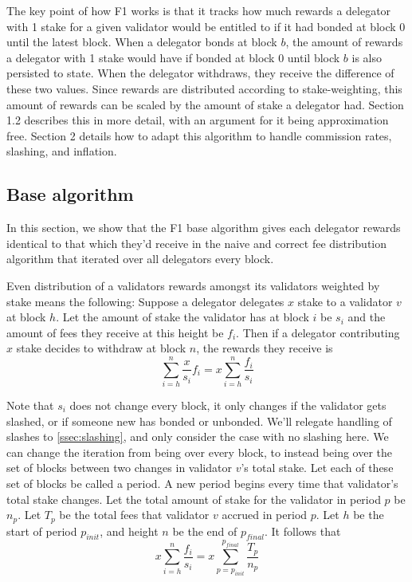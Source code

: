 \documentclass[]{article}
\begin{document}
The key point of how F1 works is that it tracks how much rewards a delegator with 1 stake for a given validator would be entitled to if it had bonded at block 0 until the latest block.
When a delegator bonds at block $b$, the amount of rewards a delegator with 1 stake would have if bonded at block 0 until block $b$ is also persisted to state.
When the delegator withdraws, they receive the difference of these two values.
Since rewards are distributed according to stake-weighting, this amount of rewards can be scaled by the amount of stake a delegator had.
Section 1.2 describes this in more detail, with an argument for it being approximation free. 
Section 2 details how to adapt this algorithm to handle commission rates, slashing, and inflation.

\subsection{Base algorithm}
In this section, we show that the F1 base algorithm gives each delegator rewards identical to that which they'd receive in the naive and correct fee distribution algorithm that iterated over all delegators every block.

Even distribution of a validators rewards amongst its validators weighted by stake means the following: 
Suppose a delegator delegates $x$ stake to a validator $v$ at block $h$.
Let the amount of stake the validator has at block $i$ be $s_i$ and the amount of fees they receive at this height be $f_i$.
Then if a delegator contributing $x$ stake decides to withdraw at block $n$, the rewards they receive is 
$$\sum_{i = h}^{n} \frac{x}{s_i}f_i = x \sum_{i = h}^{n} \frac{f_i}{s_i}$$

Note that $s_i$ does not change every block,
it only changes if the validator gets slashed, or if someone new has bonded or unbonded.
We'll relegate handling of slashes to \autoref{ssec:slashing}, and only consider the case with no slashing here.
We can change the iteration from being over every block, to instead being over the set of blocks between two changes in validator $v$'s total stake.
Let each of these set of blocks be called a period.
A new period begins every time that validator's total stake changes.
Let the total amount of stake for the validator in period $p$ be $n_p$.
Let $T_p$ be the total fees that validator $v$ accrued in period $p$.
Let $h$ be the start of period $p_{init}$, and height $n$ be the end of $p_{final}$.
It follows that 
$$x \sum_{i = h}^{n} \frac{f_i}{s_i} = x \sum_{p = p_{init}}^{p_{final}} \frac{T_p}{n_p}$$
\end{document}
